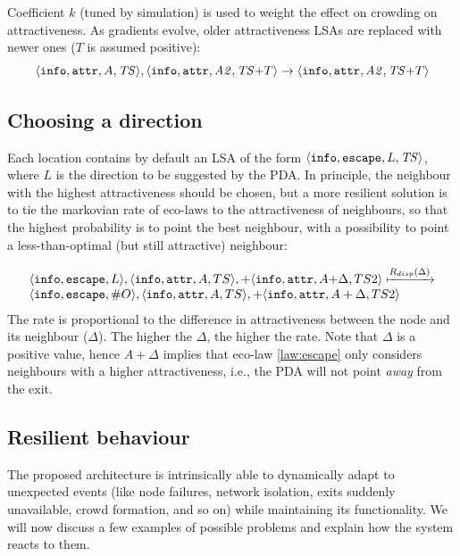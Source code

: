 \documentclass[12pt,a4paper,twoside,openright]{book}
\begin{document}
\noindent Coefficient $k$ (tuned by simulation) is used to weight the effect on crowding on attractiveness.
%
As gradients evolve, older attractiveness LSAs are replaced with newer ones ($T$ is assumed positive):
%
{\small \begin{equation}
\langle \mathtt{info}, \mathtt{attr}, A, \mathit{TS}\rangle, \langle \mathtt{info}, \mathtt{attr}, \mathit{A2}, \mathit{TS}\mathit{+}T\rangle \rightarrow \langle \mathtt{info}, \mathtt{attr}, \mathit{A2}, \mathit{TS}\mathit{+}T\rangle
\end{equation}}

\subsection{Choosing a direction}

Each location  contains by default an LSA of the form $\langle \mathtt{info}, \mathtt{escape}, L, \mathit{TS}\rangle$, where $L$ is  the direction to be suggested by the PDA.
%
In principle, the neighbour with the highest attractiveness should be chosen, but a more resilient solution is to tie the markovian rate of eco-laws to the attractiveness of neighbours, so that the highest probability is to point the best neighbour, with a possibility to point a less-than-optimal (but still attractive) neighbour:\vspace{-15pt}

\begin{equation}\label{law:escape}\begin{array}{l}
\langle \mathtt{info}, \mathtt{escape}, L\rangle, \langle \mathtt{info}, \mathtt{attr}, A, TS\rangle, 
    +\langle \mathtt{info}, \mathtt{attr}, A\mathit{+}\Delta, TS2\rangle \xmapsto{R_{disp}(\Delta)} \\
 \langle \mathtt{info}, \mathtt{escape}, \#O\rangle,
 \langle \mathtt{info}, \mathtt{attr}, A, TS\rangle,  +\langle \mathtt{info}, \mathtt{attr}, A+\Delta, TS2\rangle
 \end{array}
\end{equation}
%
\noindent 
The rate is proportional to the difference in attractiveness between the node and its neighbour ($\Delta$). The higher the $\Delta$, the higher the rate. Note that $\Delta$ is a positive value, hence  $A+\Delta$ implies that eco-law \ref{law:escape} only considers neighbours with a higher attractiveness, i.e., the PDA will not point \emph{away} from the exit.

\subsection{Resilient behaviour}
The proposed architecture is intrinsically able to dynamically adapt to unexpected events (like node failures, network isolation, exits suddenly unavailable, crowd formation, and so on) while maintaining its functionality.
%
We will now discuss a few examples of possible problems and explain how the system reacts to them.
\end{document}
